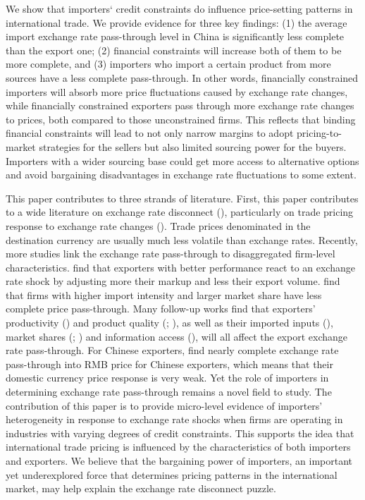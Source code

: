 \documentclass[12pt]{article}
\begin{document}
We show that importers‘ credit constraints do influence price-setting patterns in international trade. We provide evidence for three key findings: (1) the average import exchange rate pass-through level in China is significantly less complete than the export one; (2) financial constraints will increase both of them to be more complete, and (3) importers who import a certain product from more sources have a less complete pass-through. In other words, financially constrained importers will absorb more price fluctuations caused by exchange rate changes, while financially constrained exporters pass through more exchange rate changes to prices, both compared to those unconstrained firms. This reflects that binding financial constraints will lead to not only narrow margins to adopt pricing-to-market strategies for the sellers but also limited sourcing power for the buyers. Importers with a wider sourcing base could get more access to alternative options and avoid bargaining disadvantages in exchange rate fluctuations to some extent.

This paper contributes to three strands of literature. First, this paper contributes to a wide literature on exchange rate disconnect (\cite{obstfeld2000}), particularly on trade pricing response to exchange rate changes (\cite{campa2005}). Trade prices denominated in the destination currency are usually much less volatile than exchange rates. Recently, more studies link the exchange rate pass-through to disaggregated firm-level characteristics. \cite{bmm2012} find that exporters with better performance react to an exchange rate shock by adjusting more their markup and less their export volume. \cite{aik2014} find that firms with higher import intensity and larger market share have less complete price pass-through. Many follow-up works find that exporters' productivity (\cite{lmx2015}) and product quality (\cite{chen2016}; \cite{auer2018}), as well as their imported inputs (\cite{wang-yu2021}), market shares (\cite{auer2016}; \cite{devereux2017}) and information access (\cite{garetto2016}), will all affect the export exchange rate pass-through. For Chinese exporters, \cite{lmx2015} find nearly complete exchange rate pass-through into RMB price for Chinese exporters, which means that their domestic currency price response is very weak. Yet the role of importers in determining exchange rate pass-through remains a novel field to study. The contribution of this paper is to provide micro-level evidence of importers' heterogeneity in response to exchange rate shocks when firms are operating in industries with varying degrees of credit constraints. This supports the idea that international trade pricing is influenced by the characteristics of both importers and exporters. We believe that the bargaining power of importers, an important yet underexplored force that determines pricing patterns in the international market, may help explain the exchange rate disconnect puzzle. 
\end{document}
